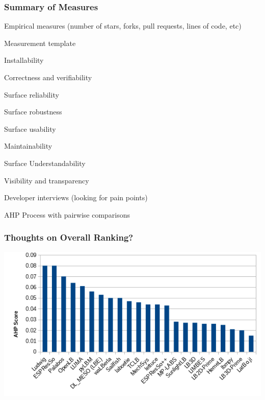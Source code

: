 \documentclass[t,12pt,numbers,fleqn]{beamer}
\begin{document}

\begin{frame}
\frametitle{Summary of Measures}

\bi
\item Empirical measures (number of stars, forks, pull requests, lines of code, etc)
\item Measurement template
  \bi
\item Installability
\item Correctness and verifiability
\item Surface reliability
\item Surface robustness
\item Surface usability
\item Maintainability
\item Surface Understandability
  \item Visibility and transparency
  \ei
\item Developer interviews (looking for pain points)
\item AHP Process with pairwise comparisons
  \ei
\end{frame}


\begin{frame}
\frametitle{Thoughts on Overall Ranking?}

\bigskip

    \includegraphics[width=1.0\textwidth]{finalscore_chart.png}

\end{frame}

\end{document}
